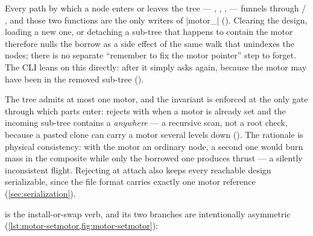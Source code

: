 \begin{designrule}
Every path by which a node enters or leaves the tree --- , ,
,  --- funnels through  /
, and those two functions are the only writers of \cppinline|motor_|
(). Clearing the design, loading a new one, or detaching a
sub-tree that happens to contain the motor therefore nulls the borrow as a side effect of the same
walk that unindexes the nodes; there is no separate ``remember to fix the motor pointer'' step to
forget. The CLI leans on this directly: after  it simply asks
 again, because the motor may have been in the removed sub-tree
().
\end{designrule}

The tree admits at most one motor, and the invariant is enforced at the only gate through which
parts enter:  rejects with  when a motor is
already set and the incoming sub-tree contains a  \emph{anywhere} --- a recursive scan,
not a root check, because a pasted clone can carry a motor several levels down
(). The rationale is physical consistency: with the motor an
ordinary node, a second one would burn mass in the composite while only the borrowed one produces
thrust --- a silently inconsistent flight. Rejecting at attach also keeps every reachable design
serializable, since the file format carries exactly one motor reference
(\cref{sec:serialization}).

 is the install-or-swap verb, and its two branches are intentionally asymmetric
(\cref{lst:motor-setmotor,fig:motor-setmotor}):

